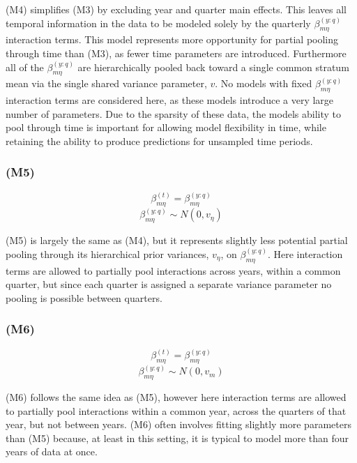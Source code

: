 \documentclass[12pt]{article}
\begin{document}
(M4) simplifies (M3) by excluding year and quarter main effects. This
leaves all temporal information in the data to be modeled solely by the
quarterly \(\beta^{(y:q)}_{m\eta}\) interaction terms. This model
represents more opportunity for partial pooling through time than (M3),
as fewer time parameters are introduced. Furthermore all of the
\(\beta^{(y:q)}_{m\eta}\) are hierarchically pooled back toward a single
common stratum mean via the single shared variance parameter, \(v\). No
models with fixed \(\beta^{(y:q)}_{m\eta}\) interaction terms are
considered here, as these models introduce a very large number of
parameters. Due to the sparsity of these data, the models ability to
pool through time is important for allowing model flexibility in time,
while retaining the ability to produce predictions for unsampled time
periods.

\subsubsection{(M5)}\label{m5}

\[\beta^{(t)}_{m\eta} = \beta^{(y:q)}_{m\eta}\]
\[\beta^{(y:q)}_{m\eta} \sim N(0, v_\eta)\]

(M5) is largely the same as (M4), but it represents slightly less
potential partial pooling through its hierarchical prior variances,
\(v_\eta\), on \(\beta^{(y:q)}_{m\eta}\). Here interaction terms are
allowed to partially pool interactions across years, within a common
quarter, but since each quarter is assigned a separate variance
parameter no pooling is possible between quarters.

\subsubsection{(M6)}\label{m6}

\[\beta^{(t)}_{m\eta} = \beta^{(y:q)}_{m\eta}\]
\[\beta^{(y:q)}_{m\eta} \sim N(0, v_m)\]

(M6) follows the same idea as (M5), however here interaction terms are
allowed to partially pool interactions within a common year, across the
quarters of that year, but not between years. (M6) often involves
fitting slightly more parameters than (M5) because, at least in this
setting, it is typical to model more than four years of data at once.
\end{document}
